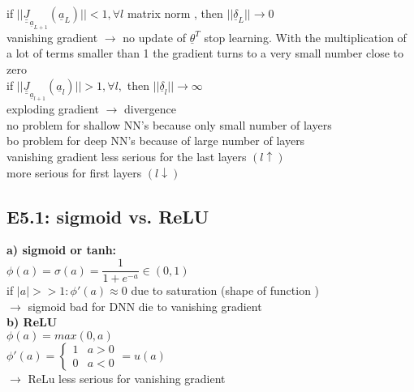  if $  || \underline{\underline{J}}_{\underline{a}_{L+1}} (\underline{a}_L) || < 1, \forall l $ matrix norm , then $  || \underline{\delta}_L || \rightarrow 0  $ \\
 vanishing gradient $\rightarrow$ no update of $  \underline{\theta}^T $ stop learning. 
 With the multiplication of a lot of terms smaller than 1 the gradient turns to a very small number close to zero \\
\textbullet if $  || \underline{\underline{J}}_{\underline{a}_{l+1}} (\underline{a}_l) || > 1, \forall l, $  then $ ||\underline{\delta}_l || \rightarrow \infty $\\
exploding gradient $\rightarrow$ divergence \\
no problem for shallow NN's because only small number of layers \\
bo problem for deep NN's because of large number of layers \\
\textbullet vanishing gradient less serious for the last layers $ (l \uparrow) $ \\
\textbullet more serious for first layers $ (l \downarrow) $ 
\subsection{E5.1: sigmoid vs. ReLU}
\textbf{a) sigmoid or tanh:} \\
$ \phi (a) = \sigma(a) = \dfrac{1}{1+ e^{-a}} \in (0,1) $ \\
if $ |a| >> 1: \phi'(a) \approx 0 $ due to saturation (shape of function )\\
$\rightarrow$ sigmoid bad for DNN die to vanishing gradient \\
\textbf{b) ReLU}\\
$  \phi (a) = max (0,a) $\\
$  \phi' (a) = \left\lbrace \begin{array}{lc}
1 & a > 0 \\
0 & a < 0
\end{array} \right. = u(a) $ \\
$\rightarrow$ ReLu less serious for vanishing gradient
